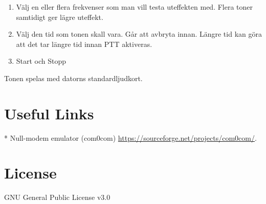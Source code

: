 \documentclass[a4paper]{article}
\begin{document}
\begin{enumerate}   
\item Välj en eller flera frekvenser som man vill testa uteffekten med. Flera toner samtidigt ger lägre uteffekt.
\item Välj den tid som tonen skall vara. Går att avbryta innan. Längre tid kan göra att det tar längre tid innan PTT aktiveras.
\item Start och Stopp
\end{enumerate}  

Tonen spelas med datorns standardljudkort.

\vspace*{50px}
\newpage


\section*{Useful Links}

* Null-modem emulator (com0com) \href{https://sourceforge.net/projects/com0com/}{https://sourceforge.net/projects/com0com/}. 

\section*{License}

GNU General Public License v3.0
\end{document}
